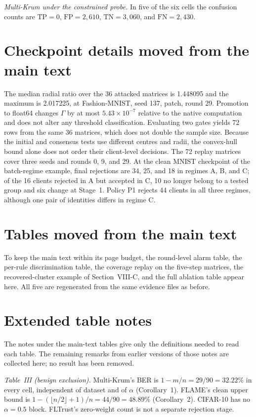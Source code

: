 \documentclass[journal]{IEEEtran}
\begin{document}
\emph{Multi-Krum under the constrained probe.} In five of the six cells the confusion counts are $\mathrm{TP}=0$, $\mathrm{FP}=2{,}610$, $\mathrm{TN}=3{,}060$, and $\mathrm{FN}=2{,}430$.

\section{Checkpoint details moved from the main text}
The median radial ratio over the 36 attacked matrices is 1.448095 and the maximum is 2.017225, at Fashion-MNIST, seed 137, patch, round 29. Promotion to float64 changes $\Gamma$ by at most $5.43\times10^{-7}$ relative to the native computation and does not alter any threshold classification. Evaluating two gates yields 72 rows from the same 36 matrices, which does not double the sample size. Because the initial and consensus tests use different centres and radii, the convex-hull bound alone does not order their client-level decisions. The 72 replay matrices cover three seeds and rounds 0, 9, and 29. At the clean MNIST checkpoint of the batch-regime example, final rejections are 34, 25, and 18 in regimes A, B, and C; of the 16 clients rejected in A but accepted in C, 10 no longer belong to a tested group and six change at Stage~1. Policy P1 rejects 44 clients in all three regimes, although one pair of identities differs in regime C.

\section{Tables moved from the main text}
To keep the main text within its page budget, the round-level alarm table, the per-rule discrimination table, the coverage replay on the five-step matrices, the recovered-cluster example of Section~VIII-C, and the full ablation table appear here. All five are regenerated from the same evidence files as before.






\section{Extended table notes}
The notes under the main-text tables give only the definitions needed to read each table. The remaining remarks from earlier versions of those notes are collected here; no result has been removed.

\emph{Table~III (benign exclusion).} Multi-Krum's BER is $1-m/n=29/90=32.22\%$ in every cell, independent of dataset and of $\alpha$ (Corollary~1). FLAME's clean upper bound is $1-(\lfloor n/2\rfloor+1)/n=44/90=48.89\%$ (Corollary~2). CIFAR-10 has no $\alpha=0.5$ block. FLTrust's zero-weight count is not a separate rejection stage.
\end{document}
